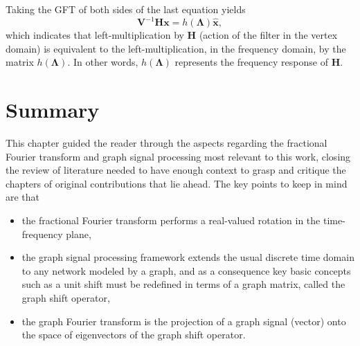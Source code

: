 Taking the GFT of both sides of the last equation yields
\begin{equation}\label{eq:resposta_freq_02}
\mathbf{V}^{-1} \mathbf{H} \mathbf{x} =
h(\mathbf{\Lambda}) \widehat{\mathbf{x}},
\end{equation}
which indicates that left-multiplication by $ \mathbf{H} $ (action of the filter in the vertex domain) is equivalent to the left-multiplication, in the frequency domain, by the matrix $ h(\mathbf{\Lambda}) $. In other words, $ h(\mathbf{\Lambda}) $ represents the frequency response of $ \mathbf{H} $.

\section{Summary}

This chapter guided the reader through the aspects regarding the fractional Fourier transform and graph signal processing most relevant to this work, closing the review of literature needed to have enough context to grasp and critique the chapters of original contributions that lie ahead. The key points to keep in mind are that
\begin{itemize}[noitemsep]
\item the fractional Fourier transform performs a real-valued rotation in the time-frequency plane,
\item the graph signal processing framework extends the usual discrete time domain to any network modeled by a graph, and as a consequence key basic concepts such as a unit shift must be redefined in terms of a graph matrix, called the graph shift operator,
\item the graph Fourier transform is the projection of a graph signal (vector) onto the space of eigenvectors of the graph shift operator.
\end{itemize}